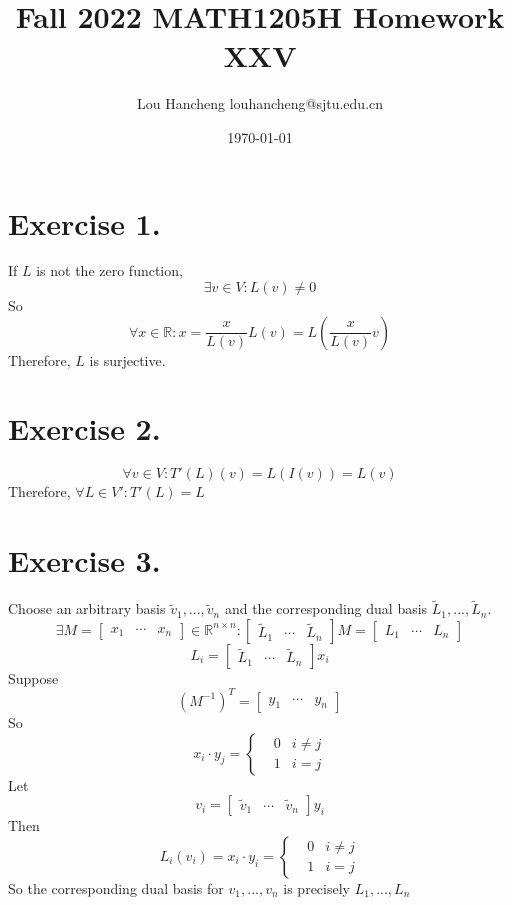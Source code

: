 \documentclass[12pt, a4paper, oneside]{article}
\title{Fall 2022 MATH1205H Homework XXV}
\author{Lou Hancheng \quad louhancheng@sjtu.edu.cn}
\date{\today}
\begin{document}
    \maketitle
    \section*{Exercise 1.}
        If $L$ is not the zero function,
        $$
            \exists v\in V:L(v)\neq 0
        $$
        So
        $$
            \forall x\in \mathbb{R}:x=\frac{x}{L(v)}L(v)=L(\frac{x}{L(v)}v)
        $$
        Therefore, $L$ is surjective.
    \section*{Exercise 2.}
        $$
            \forall v\in V : T'(L)(v)=L(I(v))=L(v)
        $$
        Therefore, $\forall L\in V':T'(L)=L$
    \section*{Exercise 3.}
        Choose an arbitrary basis $\tilde{v}_1,...,\tilde{v}_n$ and the corresponding dual basis $\tilde{L}_1,...,\tilde{L}_n$.
        $$
            \exists M=\begin{bmatrix}
                x_1 & \cdots & x_n
            \end{bmatrix}\in \mathbb{R}^{n\times n}:\begin{bmatrix}
                \tilde{L}_1 & \cdots & \tilde{L}_n
            \end{bmatrix}M=\begin{bmatrix}
                L_1 & \cdots & L_n
            \end{bmatrix}
        $$
        $$
            L_i=\begin{bmatrix}
                \tilde{L}_1 & \cdots & \tilde{L}_n
            \end{bmatrix}x_i
        $$
        Suppose
        $$
            (M^{-1})^T=\begin{bmatrix}
                y_1 & \cdots & y_n
            \end{bmatrix}
        $$
        So
        $$
            x_i\cdot y_j=\left\{\begin{aligned}
                & 0 & i\neq j\\
                & 1 & i = j
            \end{aligned}\right.
        $$
        Let
        $$
            v_i=\begin{bmatrix}
                \tilde{v}_1 & \cdots & \tilde{v}_n
            \end{bmatrix}y_i
        $$
        Then
        $$
            L_i(v_i)=x_i\cdot y_i=\left\{\begin{aligned}
                & 0 & i\neq j\\
                & 1 & i = j
            \end{aligned}\right.
        $$
        So the corresponding dual basis for $v_1, ..., v_n$ is precisely $L_1, ..., L_n$
\end{document}
